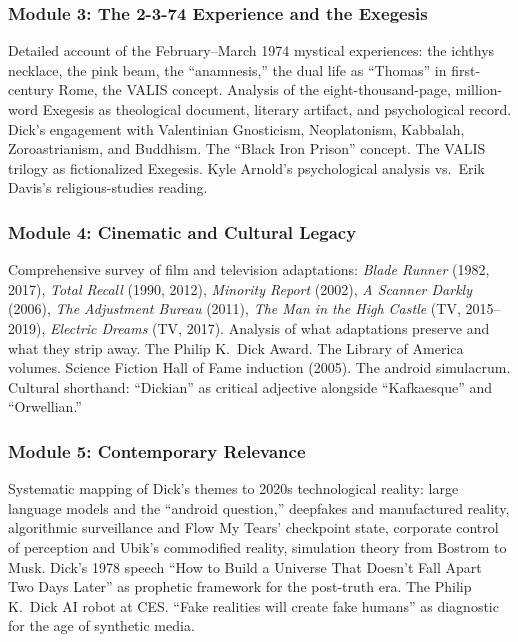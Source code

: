 \documentclass[11pt,letterpaper]{article}
\begin{document}
\subsubsection{Module 3: The 2-3-74 Experience and the Exegesis}

Detailed account of the February--March 1974 mystical experiences: the ichthys necklace, the pink beam, the ``anamnesis,'' the dual life as ``Thomas'' in first-century Rome, the VALIS concept. Analysis of the eight-thousand-page, million-word Exegesis as theological document, literary artifact, and psychological record. Dick's engagement with Valentinian Gnosticism, Neoplatonism, Kabbalah, Zoroastrianism, and Buddhism. The ``Black Iron Prison'' concept. The VALIS trilogy as fictionalized Exegesis. Kyle Arnold's psychological analysis vs.\ Erik Davis's religious-studies reading.

\subsubsection{Module 4: Cinematic and Cultural Legacy}

Comprehensive survey of film and television adaptations: \textit{Blade Runner} (1982, 2017), \textit{Total Recall} (1990, 2012), \textit{Minority Report} (2002), \textit{A Scanner Darkly} (2006), \textit{The Adjustment Bureau} (2011), \textit{The Man in the High Castle} (TV, 2015--2019), \textit{Electric Dreams} (TV, 2017). Analysis of what adaptations preserve and what they strip away. The Philip K.\ Dick Award. The Library of America volumes. Science Fiction Hall of Fame induction (2005). The android simulacrum. Cultural shorthand: ``Dickian'' as critical adjective alongside ``Kafkaesque'' and ``Orwellian.''

\subsubsection{Module 5: Contemporary Relevance}

Systematic mapping of Dick's themes to 2020s technological reality: large language models and the ``android question,'' deepfakes and manufactured reality, algorithmic surveillance and Flow My Tears' checkpoint state, corporate control of perception and Ubik's commodified reality, simulation theory from Bostrom to Musk. Dick's 1978 speech ``How to Build a Universe That Doesn't Fall Apart Two Days Later'' as prophetic framework for the post-truth era. The Philip K.\ Dick AI robot at CES. ``Fake realities will create fake humans'' as diagnostic for the age of synthetic media.
\end{document}
